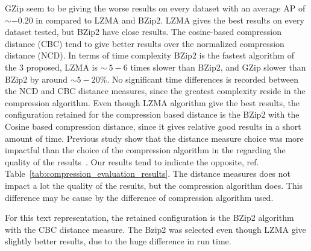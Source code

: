 GZip seem to be giving the worse results on every dataset with an average AP of $\sim -0.20$ in compared to LZMA and BZip2.
LZMA gives the best results on every dataset tested, but BZip2 have close results.
The cosine-based compression distance (CBC) tend to give better results over the normalized compression distance (NCD).
In terms of time complexity BZip2 is the fastest algorithm of the 3 proposed, LZMA is $\sim ~5-6$ times slower than BZip2, and GZip slower than BZip2 by around $\sim 5-20$\%.
No significant time differences is recorded between the NCD and CBC distance measures, since the greatest complexity reside in the compression algorithm.
Even though LZMA algorithm give the best results, the configuration retained for the compression based distance is the BZip2 with the Cosine based compression distance, since it gives relative good results in a short amount of time.
Previous study show that the distance measure choice was more impactful than the choice of the compression algorithm in the regarding the quality of the results~\cite{comparing_compression}.
Our results tend to indicate the opposite, ref. Table~\ref{tab:compression_evaluation_results}.
The distance measures does not impact a lot the quality of the results, but the compression algorithm does.
This difference may be cause by the difference of compression algorithm used.

For this text representation, the retained configuration is the BZip2 algorithm with the CBC distance measure.
The Bzip2 was selected even though LZMA give slightly better results, due to the huge difference in run time.

